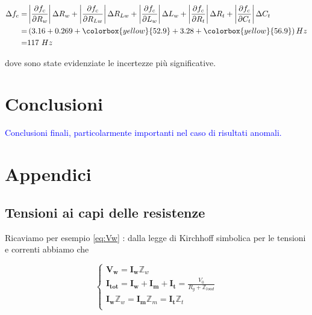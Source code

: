 \documentclass[12pt,italian]{article}
\newcommand{\prof}[1]{\textcolor{blue}{#1}}
\begin{document}
\begin{equation}
	\begin{aligned}
		\Delta f_{c} = & \left|\frac{\partial f_{c}}{\partial R_{w}}\right| \Delta R_{w} + \left|\frac{\partial f_{c}}{\partial R_{Lw}}\right| \Delta R_{Lw} + \left|\frac{\partial f_{c}}{\partial L_{w}}\right| \Delta L_{w} + \left|\frac{\partial f_{c}}{\partial R_{t}}\right| \Delta R_{t} + \left|\frac{\partial f_{c}}{\partial C_{t}}\right| \Delta C_{t} \\
		=              & \left( 3.16 + 0.269 + \colorbox{yellow}{52.9} + 3.28 + \colorbox{yellow}{56.9} \right) Hz                                                                                                                                                                                                                                                 \\
		=              & 117 \ Hz
	\end{aligned}
\end{equation}

\noindent
dove sono state evidenziate le incertezze più significative.

\section*{Conclusioni}
\prof{Conclusioni finali, particolarmente importanti nel caso di risultati
	anomali.}

\appendix
\section{Appendici}
\subsection{Tensioni ai capi delle resistenze}
\label{sec:tensioni}

Ricaviamo per esempio \eqref{eq:Vw} : dalla legge di Kirchhoff simbolica per le
tensioni e correnti abbiamo che

\begin{equation}
	\begin{cases}
		\mathbf{V_{w}} = \mathbf{I_{w}} \mathbb{Z}_{w}                                                                \\
		\mathbf{I_{tot}} = \mathbf{I_{w}} + \mathbf{I_{m}} + \mathbf{I_{t}} = \frac{V_{0}}{R_{g} + \mathbb{Z}_{load}} \\
		\mathbf{I_{w}} \mathbb{Z}_{w} = \mathbf{I_{m}} \mathbb{Z}_{m} = \mathbf{I_{t}} \mathbb{Z}_{t}                 \\
	\end{cases}
\end{equation}
\end{document}
